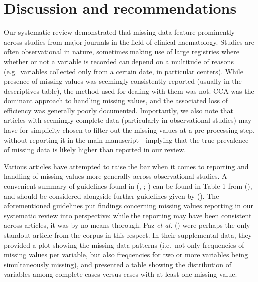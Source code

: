 \documentclass[
  letterpaper,
  DIV=11,
  numbers=noendperiod]{scrreprt}
\begin{document}
\section{Discussion and
recommendations}\label{discussion-and-recommendations}

Our systematic review demonstrated that missing data feature prominently
across studies from major journals in the field of clinical haematology.
Studies are often observational in nature, sometimes making use of large
registries where whether or not a variable is recorded can depend on a
multitude of reasons (e.g.~variables collected only from a certain date,
in particular centers). While presence of missing values was seemingly
consistently reported (usually in the descriptives table), the method
used for dealing with them was not. CCA was the dominant approach to
handling missing values, and the associated loss of efficiency was
generally poorly documented. Importantly, we also note that articles
with seemingly complete data (particularly in observational studies) may
have for simplicity chosen to filter out the missing values at a
pre-processing step, without reporting it in the main manuscript -
implying that the true prevalence of missing data is likely higher than
reported in our review.

Various articles have attempted to raise the bar when it comes to
reporting and handling of missing values more generally across
observational studies. A convenient summary of guidelines found in
(, ;
) can be found in Table 1 from
(),
and should be considered alongside further guidelines given by
(). The aforementioned guidelines put findings concerning missing
values reporting in our systematic review into perspective: while the
reporting may have been consistent across articles, it was by no means
thorough. Paz \emph{et al.}
() were perhaps the
only standout article from the corpus in this respect. In their
supplemental data, they provided a plot showing the missing data
patterns (i.e.~not only frequencies of missing values per variable, but
also frequencies for two or more variables being simultaneously
missing), and presented a table showing the distribution of variables
among complete cases versus cases with at least one missing value.
\end{document}
